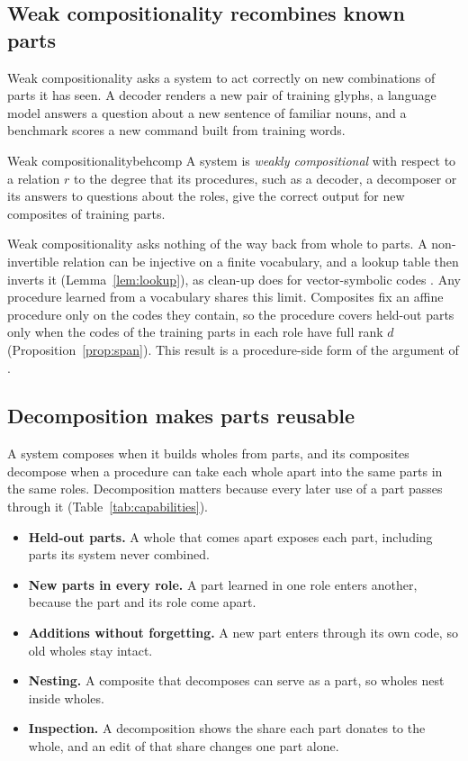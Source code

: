 \subsection{Weak compositionality recombines known parts}
\label{sec:notions}

Weak compositionality asks a system to act correctly on new combinations of parts it has seen. A decoder renders a new pair of training glyphs, a language model answers a question about a new sentence of familiar nouns, and a benchmark scores a new command built from training words.

\begin{defbox}{Weak compositionality}{behcomp}
A system is \emph{weakly compositional} with respect to a relation $r$ to the degree that its procedures, such as a decoder, a decomposer or its answers to questions about the roles, give the correct output for new composites of training parts.
\end{defbox}

Weak compositionality asks nothing of the way back from whole to parts. A non-invertible relation can be injective on a finite vocabulary, and a lookup table then inverts it (Lemma~\ref{lem:lookup}), as clean-up does for vector-symbolic codes \citep{plate1995}. Any procedure learned from a vocabulary shares this limit. Composites fix an affine procedure only on the codes they contain, so the procedure covers held-out parts only when the codes of the training parts in each role have full rank $d$ (Proposition~\ref{prop:span}). This result is a procedure-side form of the argument of \citet{marcus1998}.

\subsection{Decomposition makes parts reusable}
\label{sec:decomposition}

A system composes when it builds wholes from parts, and its composites decompose when a procedure can take each whole apart into the same parts in the same roles. Decomposition matters because every later use of a part passes through it (Table~\ref{tab:capabilities}).
\begin{itemize}
  \item \textbf{Held-out parts.} A whole that comes apart exposes each part, including parts its system never combined.
  \item \textbf{New parts in every role.} A part learned in one role enters another, because the part and its role come apart.
  \item \textbf{Additions without forgetting.} A new part enters through its own code, so old wholes stay intact.
  \item \textbf{Nesting.} A composite that decomposes can serve as a part, so wholes nest inside wholes.
  \item \textbf{Inspection.} A decomposition shows the share each part donates to the whole, and an edit of that share changes one part alone.
\end{itemize}

